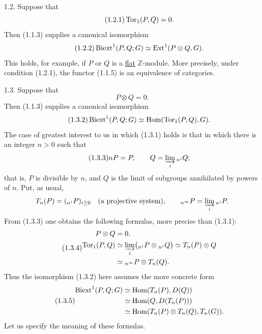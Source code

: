1.2. Suppose that
\begin{equation}\tag{1.2.1}
 \operatorname{Tor}_1(P,Q)=0.
\end{equation}
Then (1.1.3) supplies a canonical isomorphism
\begin{equation}\tag{1.2.2}
 \operatorname{Biext}^1(P,Q;G)\simeq\operatorname{Ext}^1(P\otimes Q,G).
\end{equation}
This holds, for example, if $P$ or $Q$ is a \underline{flat}
$\mathbb Z$-module.  More precisely, under condition (1.2.1), the
functor (1.1.5) is an equivalence of categories.

1.3. Suppose that
\begin{equation}\tag{1.3.1}
 P\otimes Q=0.
\end{equation}
Then (1.1.3) supplies a canonical isomorphism
\begin{equation}\tag{1.3.2}
 \operatorname{Biext}^1(P,Q;G)\simeq\operatorname{Hom}(\operatorname{Tor}_1(P,Q),G).
\end{equation}
The case of greatest interest to us in which (1.3.1) holds is that in
which there is an integer $n>0$ such that
\begin{equation}\tag{1.3.3}
 nP=P,\qquad
 Q=\varinjlim_i {}_{n^i}Q;
\end{equation}
that is, $P$ is divisible by $n$, and $Q$ is the limit of subgroups
annihilated by powers of $n$.  Put, as usual,
\[
 T_n(P)=({}_{n^i}P)_{i\geq0}\quad\text{(a projective system)},\qquad
 {}_{n^\infty}P=\varinjlim_i{}_{n^i}P.
\]
From (1.3.3) one obtains the following formulas, more precise than
(1.3.1):
\begin{equation}\tag{1.3.4}
\begin{split}
 P\otimes Q&=0,\\
 \operatorname{Tor}_1(P,Q)
 &\simeq\varinjlim_i
   \bigl({}_{n^i}P\otimes{}_{n^i}Q\bigr)
 \simeq T_n(P)\otimes Q\\
 &\simeq{}_{n^\infty}P\otimes T_n(Q).
\end{split}
\end{equation}
Thus the isomorphism (1.3.2) here assumes the more concrete form
\begin{equation}\tag{1.3.5}
\begin{split}
 \operatorname{Biext}^1(P,Q;G)
 &\simeq\operatorname{Hom}(T_n(P),D(Q))\\
 &\simeq\operatorname{Hom}(Q,D(T_n(P)))\\
 &\simeq\operatorname{Hom}(T_n(P)\otimes T_n(Q),T_n(G)).
\end{split}
\end{equation}
Let us specify the meaning of these formulas.

